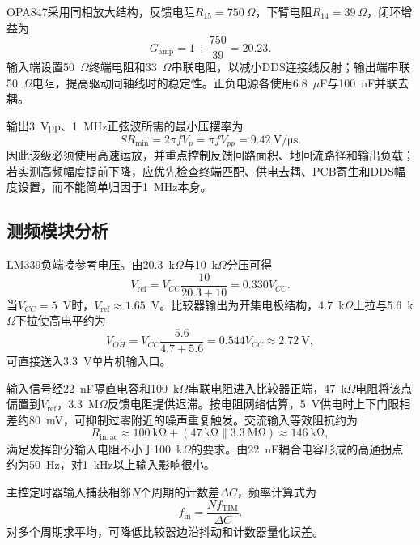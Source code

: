 \documentclass[a4paper]{article}
\begin{document}
OPA847采用同相放大结构，反馈电阻$R_{15}=750~\Omega$，下臂电阻$R_{14}=39~\Omega$，闭环增益为
\begin{equation}
G_{\mathrm{amp}}=1+\frac{750}{39}=20.23.
\end{equation}
输入端设置50~$\Omega$终端电阻和33~$\Omega$串联电阻，以减小DDS连接线反射；输出端串联50~$\Omega$电阻，提高驱动同轴线时的稳定性。正负电源各使用6.8~$\mu$F与100~nF并联去耦。

输出3~Vpp、1~MHz正弦波所需的最小压摆率为
\begin{equation}
SR_{\min}=2\pi fV_p=\pi fV_{pp}=9.42~\mathrm{V/\mu s}.
\end{equation}
因此该级必须使用高速运放，并重点控制反馈回路面积、地回流路径和输出负载；若实测高频幅度提前下降，应优先检查终端匹配、供电去耦、PCB寄生和DDS幅度设置，而不能简单归因于1~MHz本身。

\subsection{测频模块分析}

LM339负端接参考电压。由20.3~k$\Omega$与10~k$\Omega$分压可得
\begin{equation}
V_{\mathrm{ref}}=V_{CC}\frac{10}{20.3+10}=0.330V_{CC}.
\end{equation}
当$V_{CC}=5$~V时，$V_{\mathrm{ref}}\approx1.65$~V。比较器输出为开集电极结构，4.7~k$\Omega$上拉与5.6~k$\Omega$下拉使高电平约为
\begin{equation}
V_{OH}=V_{CC}\frac{5.6}{4.7+5.6}=0.544V_{CC}\approx2.72~\mathrm{V},
\end{equation}
可直接送入3.3~V单片机输入口。

输入信号经22~nF隔直电容和100~k$\Omega$串联电阻进入比较器正端，47~k$\Omega$电阻将该点偏置到$V_{\mathrm{ref}}$，3.3~M$\Omega$反馈电阻提供迟滞。按电阻网络估算，5~V供电时上下门限相差约80~mV，可抑制过零附近的噪声重复触发。交流输入等效阻抗约为
\begin{equation}
R_{\mathrm{in,ac}}\approx100~\mathrm{k\Omega}+(47~\mathrm{k\Omega}\parallel3.3~\mathrm{M\Omega})\approx146~\mathrm{k\Omega},
\end{equation}
满足发挥部分输入电阻不小于100~k$\Omega$的要求。由22~nF耦合电容形成的高通拐点约为50~Hz，对1~kHz以上输入影响很小。

主控定时器输入捕获相邻$N$个周期的计数差$\Delta C$，频率计算式为
\begin{equation}
f_{\mathrm{in}}=\frac{Nf_{\mathrm{TIM}}}{\Delta C}.
\end{equation}
对多个周期求平均，可降低比较器边沿抖动和计数器量化误差。
\end{document}
